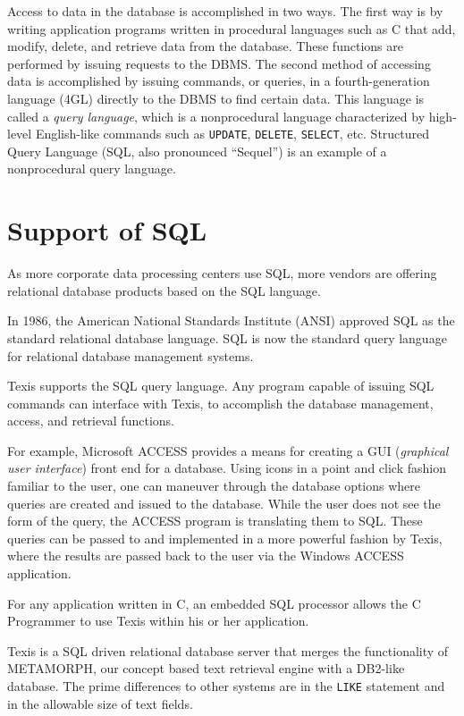 Access to data in the database is accomplished in two ways.  The first
way is by writing application programs written in procedural languages
such as C that add, modify, delete, and retrieve data from the
database.  These functions are performed by issuing requests to the
DBMS.  The second method of accessing data is accomplished by issuing
commands, or queries, in a fourth-generation language (4GL) directly
to the DBMS to find certain data.  This language is called a {\em
query language}, which is a nonprocedural language characterized by
high-level English-like commands such as \verb`UPDATE`, \verb`DELETE`, \verb`SELECT`, etc.
Structured Query Language (SQL, also pronounced ``Sequel'') is an
example of a nonprocedural query language.

\section{Support of SQL}

As more corporate data processing centers use SQL, more vendors are
offering relational database products based on the SQL language.

In 1986, the American National Standards Institute (ANSI) approved SQL
as the standard relational database language.  SQL is now the standard
query language for relational database management systems.

Texis supports the SQL query language.  Any program capable of issuing
SQL commands can interface with Texis, to accomplish the database
management, access, and retrieval functions.

For example, Microsoft ACCESS provides a means for creating a GUI
({\em graphical user interface}) front end for a database.  Using
icons in a point and click fashion familiar to the user, one can
maneuver through the database options where queries are created and
issued to the database.  While the user does not see the form of the
query, the ACCESS program is translating them to SQL.  These queries
can be passed to and implemented in a more powerful fashion by Texis,
where the results are passed back to the user via the Windows ACCESS
application.

For any application written in C, an embedded SQL processor allows the
C Programmer to use Texis within his or her application.

Texis is a SQL driven relational database server that merges the
functionality of METAMORPH, our concept based text retrieval engine
with a DB2-like database.  The prime differences to other systems are
in the \verb`LIKE` statement and in the allowable size of text fields.

